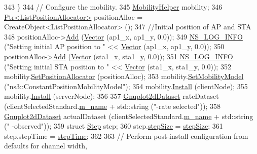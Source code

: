 \begin{DoxyCode}
343     \}
344   \textcolor{comment}{// Configure the mobility.}
345   \hyperlink{classns3_1_1MobilityHelper}{MobilityHelper} mobility;
346   \hyperlink{classns3_1_1Ptr}{Ptr<ListPositionAllocator>} positionAlloc = CreateObject<ListPositionAllocator> 
      ();
347   \textcolor{comment}{//Initial position of AP and STA}
348   positionAlloc->\hyperlink{classns3_1_1ListPositionAllocator_a460e82f015ac012a73ba0ea0cccb3486}{Add} (\hyperlink{classns3_1_1Vector3D_a7e59b47bc94c9cb1dadff68c1d0112d8}{Vector} (ap1\_x, ap1\_y, 0.0));
349   \hyperlink{group__logging_gafbd73ee2cf9f26b319f49086d8e860fb}{NS\_LOG\_INFO} (\textcolor{stringliteral}{"Setting initial AP position to "} << \hyperlink{classns3_1_1Vector3D_a7e59b47bc94c9cb1dadff68c1d0112d8}{Vector} (ap1\_x, ap1\_y, 0.0));
350   positionAlloc->\hyperlink{classns3_1_1ListPositionAllocator_a460e82f015ac012a73ba0ea0cccb3486}{Add} (\hyperlink{classns3_1_1Vector3D_a7e59b47bc94c9cb1dadff68c1d0112d8}{Vector} (sta1\_x, sta1\_y, 0.0));
351   \hyperlink{group__logging_gafbd73ee2cf9f26b319f49086d8e860fb}{NS\_LOG\_INFO} (\textcolor{stringliteral}{"Setting initial STA position to "} << \hyperlink{classns3_1_1Vector3D_a7e59b47bc94c9cb1dadff68c1d0112d8}{Vector} (sta1\_x, sta1\_y, 0.0));
352   mobility.\hyperlink{classns3_1_1MobilityHelper_ac59d5295076be3cc11021566713a28c5}{SetPositionAllocator} (positionAlloc);
353   mobility.\hyperlink{classns3_1_1MobilityHelper_a030275011b6f40682e70534d30280aba}{SetMobilityModel} (\textcolor{stringliteral}{"ns3::ConstantPositionMobilityModel"});
354   mobility.\hyperlink{classns3_1_1MobilityHelper_a07737960ee95c0777109cf2994dd97ae}{Install} (clientNode);
355   mobility.\hyperlink{classns3_1_1MobilityHelper_a07737960ee95c0777109cf2994dd97ae}{Install} (serverNode);
356 
357   \hyperlink{classns3_1_1Gnuplot2dDataset}{Gnuplot2dDataset} rateDataset (clientSelectedStandard.\hyperlink{structStandardInfo_a101f61fce329acf44c178f191d89bc2b}{m\_name} + std::string (\textcolor{stringliteral}{"-rate
       selected"}));
358   \hyperlink{classns3_1_1Gnuplot2dDataset}{Gnuplot2dDataset} actualDataset (clientSelectedStandard.\hyperlink{structStandardInfo_a101f61fce329acf44c178f191d89bc2b}{m\_name} + std::string (\textcolor{stringliteral}{"
      -observed"}));
359   \textcolor{keyword}{struct }\hyperlink{structStep}{Step} step;
360   step.\hyperlink{structStep_a54f255b32f86ab9fced0a0002dcb9420}{stepSize} = \hyperlink{structStep_a54f255b32f86ab9fced0a0002dcb9420}{stepSize};
361   step.stepTime = \hyperlink{structStep_a9d7cdfbd213343951d23c3c4c61604bd}{stepTime};
362 
363   \textcolor{comment}{// Perform post-install configuration from defaults for channel width,}

\end{DoxyCode}
